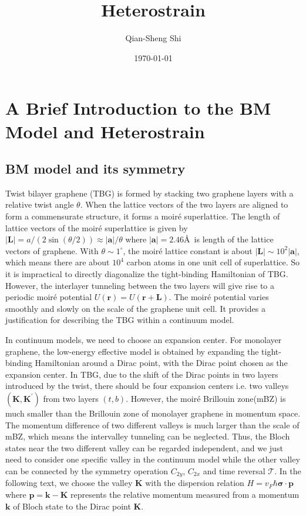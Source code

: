 \documentclass[10pt, oneside]{article}
\title{Heterostrain}
\author[1]{Qian-Sheng Shi}
\affil[1]{\textit{School of Physical Science and Technology, ShanghaiTech University, Shanghai 201210, China}}
\date{\today}
\newcommand{\te}{\theta}
\newcommand{\pr}{\prime}
\newcommand{\p}[1]{\left(#1\right)}
\newcommand{\bv}[1]{\left|#1\right|}
\begin{document}
	
\maketitle

\tableofcontents

\section{A Brief Introduction to the BM Model and  Heterostrain}
\subsection{BM model and its symmetry}
Twist bilayer graphene (TBG) is formed by stacking two graphene layers with a relative twist angle \(\te\). When the lattice vectors of the two layers are aligned to form a commensurate structure, it forms a moir\'e superlattice. The length of  lattice vectors of the moir\'e superlattice is given by \(\bv{\bm{L}}= a/\p{2 \sin \p{\te/2}} \approx \bv{\bm{a}}/\te\) where \(\bv{\bm{a}} = 2.46\)\AA ~is length of the lattice vectors of graphene. With \(\te \sim 1 ^{\circ}\), the moir\'e lattice constant is about \(\bv{\bm{L}} \sim 10^2 \bv{\bm{a}}\), which means there are about \(10^4\) carbon atoms in one unit cell of superlattice. So it is impractical to directly diagonalize the tight-binding Hamiltonian of TBG. However, the interlayer tunneling between the two layers will give rise to a periodic moir\'e potential \(U\p{\bm{r}} = U \p{\bm{r} + \bm{L}}\). The moir\'e potential varies smoothly and slowly on the scale of the graphene unit cell. It provides a justification for describing the TBG within a continuum model.


In continuum models, we need to choose an expansion center. For monolayer graphene, the low-energy effective model is obtained by expanding the tight-binding Hamiltonian around a Dirac point, with the Dirac point chosen as the expansion center. In TBG, due to the shift of the Dirac points in two layers introduced by the twist, there should be four expansion centers i.e. two valleys \(\p{\bm{K}, \bm{K}^\pr}\) from two layers \(\p{t,b}\). However, the moir\'e Brillouin zone(mBZ) is much smaller than the Brillouin zone of monolayer graphene in momentum space. The momentum difference of two different valleys is much larger than the scale of mBZ, which means the intervalley tunneling can be neglected. Thus, the Bloch states near the two different valley can be regarded independent, and we just need to consider one specific valley in the continuum model while the other valley can be connected by the symmetry operation \(C_{2y}\), \(C_{2x}\) and time reversal \(\mathcal{T}\). In the following text, we choose the valley \(\bm{K}\) with the dispersion relation \(H = v_{F} \hbar \bm{\sigma} \cdot \bm{p}\) where \(\bm{p} = \bm{k} - \bm{K}\) represents the relative momentum measured from a momentum \(\bm{k}\) of Bloch state to the Dirac point \(\bm{K}\). 
\end{document}

